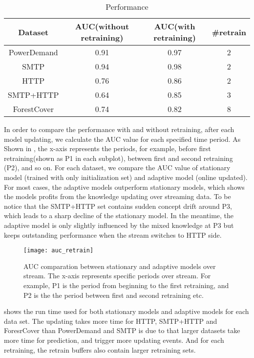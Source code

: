 \begin{table}[h] 
\caption{Performance} 
\centering      
\begin{tabular}{c | c | c | c}  
\hline  
Dataset & AUC(without retraining) & AUC(with retraining) & \#retrain \\ 
\hline 
PowerDemand & 0.91 & 0.97 & 2  \\  
\hline 
SMTP & 0.94 &  0.98 &  2 \\ 
\hline 
HTTP & 0.76 &  0.86 &  2 \\ 
\hline
SMTP+HTTP & 0.64 & 0.85 & 3 \\
\hline 
ForestCover &0.74&0.82 & 8\\   
\hline    
\end{tabular}
\label{tab:performance}  
\end{table} 
In order to compare the performance with and without retraining, after each model updating, we calculate the AUC value for each specified time period. As Shown in , the x-axis represents the periods, for example, before first retraining(shown as P1 in each subplot), between first and second retraining (P2), and so on. For each dataset, we compare the AUC value of stationary model (trained with only initialization set) and adaptive model (online updated). For most cases, the adaptive models outperform stationary models, which shows the models profits from the knowledge updating over streaming data. To be notice that the SMTP+HTTP set contains sudden concept drift around P3, which leads to a sharp decline of the stationary model. In the meantime, the adaptive model is only slightly influenced by the mixed knowledge at P3 but keeps outstanding performance when the stream switches to HTTP side.\\
\begin{figure}[h]
\centering
\texttt{[image: auc\_retrain]}
\caption[AUC comparation between stationary and adaptive models over stream]{AUC comparation between stationary and adaptive models over stream. The x-axis represents specific periods over stream. For example, P1 is the period from beginning to the first retraining, and P2 is the the period between first and second retraining etc.}
\label{fig:auc_retrain}
\end{figure}

 shows the run time used for both stationary models and adaptive models for each data set. The updating takes more time for HTTP, SMTP+HTTP and ForesrCover than PowerDemand and SMTP is due to that larger datasets take more time for prediction, and trigger more updating events. And for each retraining, the retrain buffers also contain larger retraining sets.\\



